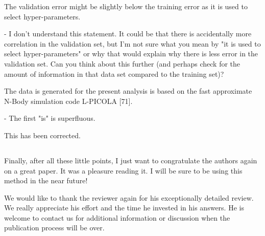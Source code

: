 \documentclass[12pt,a4paper]{article}
\newcommand{\nati}[1]{{\color[rgb]{.1,.6,.1}{NP: #1}}}
\newcommand{\1}{\b{1}}              %
\newcommand{\0}{\b{0}}              %
\begin{document}
\begin{mdframed}[style=comment]
The validation error might be slightly below the training error as it is used to select hyper-parameters.

- I don't understand this statement. It could be that there is accidentally more correlation in the validation set, but I'm not sure what you mean by "it is used to select hyper-parameters" or why that would explain why there is less error in the validation set. Can you think about this further (and perhaps check for the amount of information in that data set compared to the training set)?
\end{mdframed}
\nati{
We changed the sentence as:
\begin{mdframed}[style=manuscript]
The validation error might be slightly below the training error as the validation set is used to select hyper-parameters.
\end{mdframed}
For linear SVM, there is one hyper-parameter to tune. As we select the hyperparameter with the lowest validation error, it is possible that the validation error is lower than the training error.}

\begin{mdframed}[style=comment]
The data is generated for the present analysis is based on the fast approximate N-Body simulation code L-PICOLA [71].

- The first "is" is superfluous.
\end{mdframed}
This has been corrected.

\subsection{}

\begin{mdframed}[style=comment]

Finally, after all these little points, I just want to congratulate the authors again on a great paper. It was a pleasure reading it. I will be sure to be using this method in the near future!
\end{mdframed}
We would like to thank the reviewer again for his exceptionally detailed review. We really appreciate his effort and the time he invested in his answers.
He is welcome to contact us for additional information or discussion when the publication process will be over.



\clearpage
\newpage



\end{document}
